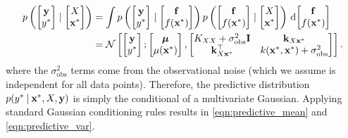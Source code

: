 \begin{align*}
  p \left(
    \begin{bmatrix} \by \\ \ytest \end{bmatrix} \mid
    \begin{bmatrix} \bX \\ \bxtest \end{bmatrix}
  \right)
  &= \int
    p \left(
      \begin{bmatrix} \by \\ \ytest \end{bmatrix} \mid
      \begin{bmatrix} \bfn \\ f(\bxtest) \end{bmatrix}
    \right)
    p \left(
      \begin{bmatrix} \bfn \\ f(\bxtest) \end{bmatrix} \mid
      \begin{bmatrix} \bX \\ \bxtest \end{bmatrix}
    \right)
    \intd { \begin{bmatrix} \bfn \\ f(\bxtest) \end{bmatrix} }
  \\
  \vspace{0.5em}
  &= \normaldist{
    \begin{bmatrix} \by \\ \ytest \end{bmatrix} ;
    \begin{bmatrix} \bmu \\ \mu(\bxtest) \end{bmatrix}
  }{
    \begin{bmatrix}
      \bK_{\bX \bX} + \sigma_\text{obs}^2 \mathbf I   & \bk_{\bX \bxtest} \\
      \bk_{\bX \bxtest}^\top         & k(\bxtest, \bxtest) + \sigma_\text{obs}^2
    \end{bmatrix}
  }.
\end{align*}
where the $\sigma_\text{obs}^2$ terms come from the observational noise (which we assume is independent for all data points).
%
Therefore, the predictive distribution $p(y^* \: \vert \: \mathbf{x}^*, X, \mathbf{y})$ is simply the conditional of a multivariate Gaussian.
Applying standard Gaussian conditioning rules \citep[see e.g.][]{bishop2006pattern,rasmussen2006gaussian} results in \cref{eqn:predictive_mean} and \cref{eqn:predictive_var}.

